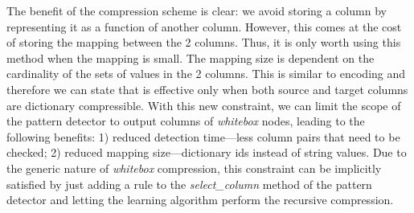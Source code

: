 The benefit of the  compression scheme is clear: we avoid storing a column by representing it as a function of another column. However, this comes at the cost of storing the mapping between the 2 columns. Thus, it is only worth using this method when the mapping is small. The mapping size is dependent on the cardinality of the sets of values in the 2 columns. This is similar to  encoding and therefore we can state that  is effective only when both source and target columns are dictionary compressible.  With this new constraint, we can limit the scope of the  pattern detector to output columns of \textit{whitebox}  nodes, leading to the following benefits: 1) reduced detection time---less column pairs that need to be checked; 2) reduced mapping size---dictionary ids instead of string values. Due to the generic nature of \textit{whitebox} compression, this constraint can be implicitly satisfied by just adding a rule to the \textit{select\_column} method of the  pattern detector and letting the learning algorithm perform the recursive compression.


\iffalse
- have a somewhat similar shape
- our approach seems to give higher overall coefs, but both give perfect correlation score (1.0) to the same columns (both make the distinction between perfectly correlated columns and the others)
- we are only interested in close to perfect correlations, therefore...
- for our purpose correlation is only useful if we can represent a column as a mapping of another
- the exceptions will be given solely by the mapping; the correlation coef is the inverse of the exceptions
- the corr coef, mapping and expcetion rate are strictly dependable on each other. therefor our compression ratio will depend on them;
for this reason we chose to use our correlation coef instead of CV or TU; they do not bring any addtional value
- regardless of the differecens between the 3, we will use...
\fi


